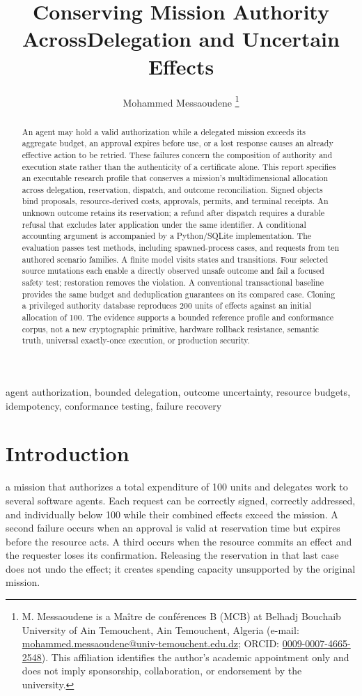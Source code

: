 \documentclass[10pt,journal,a4paper]{IEEEtran}
\title{Conserving Mission Authority Across\newline Delegation and Uncertain Effects}
\author{Mohammed Messaoudene%
\thanks{M. Messaoudene is a Ma\^itre de conf\'erences B (MCB) at Belhadj Bouchaib University of Ain Temouchent, Ain Temouchent, Algeria (e-mail: \href{mailto:mohammed.messaoudene@univ-temouchent.edu.dz}{mohammed.messaoudene@univ-temouchent.edu.dz}; ORCID: \href{https://orcid.org/0009-0007-4665-2548}{0009-0007-4665-2548}). This affiliation identifies the author's academic appointment only and does not imply sponsorship, collaboration, or endorsement by the university.}}
\begin{document}
\maketitle
\begin{abstract}
An agent may hold a valid authorization while a delegated mission exceeds its aggregate budget, an approval expires before use, or a lost response causes an already effective action to be retried. These failures concern the composition of authority and execution state rather than the authenticity of a certificate alone. This report specifies an executable research profile that conserves a mission's multidimensional allocation across delegation, reservation, dispatch, and outcome reconciliation. Signed objects bind proposals, resource-derived costs, approvals, permits, and terminal receipts. An unknown outcome retains its reservation; a refund after dispatch requires a durable refusal that excludes later application under the same identifier. A conditional accounting argument is accompanied by a Python/SQLite implementation. The evaluation passes \UnitCount{} test methods, including \ProcessCount{} spawned-process cases, and \CaseCount{} requests from ten authored scenario families. A finite model visits \StateCount{} states and \TransitionCount{} transitions. Four selected source mutations each enable a directly observed unsafe outcome and fail a focused safety test; restoration removes the violation. A conventional transactional baseline provides the same budget and deduplication guarantees on its compared case. Cloning a privileged authority database reproduces 200 units of effects against an initial allocation of 100. The evidence supports a bounded reference profile and conformance corpus, not a new cryptographic primitive, hardware rollback resistance, semantic truth, universal exactly-once execution, or production security.
\end{abstract}
\begin{IEEEkeywords}
agent authorization, bounded delegation, outcome uncertainty, resource budgets, idempotency, conformance testing, failure recovery
\end{IEEEkeywords}

\section{Introduction}
 a mission that authorizes a total expenditure of 100 units and delegates work to several software agents. Each request can be correctly signed, correctly addressed, and individually below 100 while their combined effects exceed the mission. A second failure occurs when an approval is valid at reservation time but expires before the resource acts. A third occurs when the resource commits an effect and the requester loses its confirmation. Releasing the reservation in that last case does not undo the effect; it creates spending capacity unsupported by the original mission.
\end{document}
